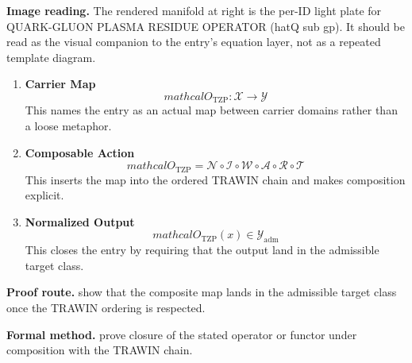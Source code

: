 \begin{samepage}
\noindent\begin{minipage}[t]{0.45\linewidth}
\vspace{0pt}
\raggedright
\scriptsize\textbf{Image reading.} The rendered manifold at right is the per-ID light plate for QUARK-GLUON PLASMA RESIDUE OPERATOR (hatQ sub gp). It should be read as the visual companion to the entry's equation layer, not as a repeated template diagram.\par
\end{minipage}\hfill
\begin{minipage}[t]{0.53\linewidth}
\vspace*{-0.10in}
\raggedright
{}
\end{minipage}
\end{samepage}

\clearpage


\begin{enumerate}[leftmargin=1.6em,itemsep=9pt,topsep=6pt]
\item \textbf{Carrier Map}
\[
mathcal{O}_{\mathrm{TZP}} : \mathcal{X} \to \mathcal{Y}
\]
This names the entry as an actual map between carrier domains rather than a loose metaphor.

\item \textbf{Composable Action}
\[
mathcal{O}_{\mathrm{TZP}} = \mathcal{N}\circ \mathcal{I}\circ \mathcal{W}\circ \mathcal{A}\circ \mathcal{R}\circ \mathcal{T}
\]
This inserts the map into the ordered TRAWIN chain and makes composition explicit.

\item \textbf{Normalized Output}
\[
mathcal{O}_{\mathrm{TZP}}(x) \in \mathcal{Y}_{\mathrm{adm}}
\]
This closes the entry by requiring that the output land in the admissible target class.
\end{enumerate}

\textbf{Proof route.} show that the composite map lands in the admissible target class once the TRAWIN ordering is respected.

\textbf{Formal method.} prove closure of the stated operator or functor under composition with the TRAWIN chain.

\medskip
{}

